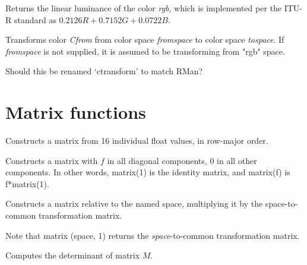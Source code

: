 \documentclass[11pt,letterpaper]{book}
\def\float{{\cf float}\xspace}
\def\matrix{{\cf matrix}\xspace}
\def\rgbspace{{\cf "rgb"} space\xspace}
\begin{document}
Returns the linear luminance of the color \emph{rgb}, which is
implemented per the ITU-R standard as $0.2126 R + 0.7152 G + 0.0722 B$.
\apiend

Transforms color \emph{Cfrom} from color space \emph{fromspace} to
color space \emph{tospace}.  If \emph{fromspace} is not supplied,
it is assumed to be transforming from \rgbspace.

\begin{annotate}
\QUESTION Should this be renamed `ctransform' to match RMan?
\end{annotate}
\apiend


\section{Matrix functions}
\label{sec:stdlib:matrix}

Constructs a \matrix from 16 individual \float values, in row-major
order.  
\apiend

Constructs a \matrix with $f$ in all diagonal components, 0 in all other
components.  In other words, {\cf matrix(1)} is the identity matrix, and
{\cf matrix(f)} is {\cf f*matrix(1)}.
\apiend

Constructs a \matrix relative to the named space, multiplying it by the
{\cf space}-to-{\cf common} transformation matrix.  

Note that {\cf matrix (space, 1)} returns the 
\emph{space}-to-{\cf common} transformation matrix.
\apiend

Computes the determinant of matrix $M$.
\apiend
\end{document}
